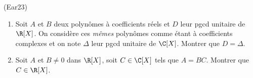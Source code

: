\begin{tiny}(Ear23)\end{tiny}
\begin{enumerate}
 \item  Soit $A$ et $B$ deux polynômes à coefficients réels et $D$ leur pgcd unitaire de $\R[X]$. On considère ces \emph{mêmes} polynômes comme étant à coefficients complexes et on note $\Delta$ leur pgcd unitaire de $\C[X]$.\newline
Montrer que $D=\Delta$.
\item Soit $A$ et $B\neq 0$ dans $\R[X]$, soit $C\in \C[X]$ tels que $A=BC$. Montrer que $C\in \R[X]$.
\end{enumerate}
